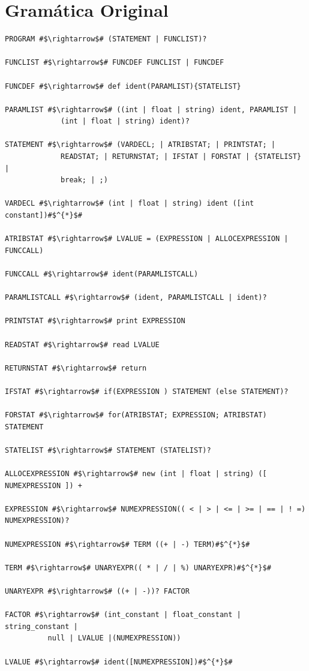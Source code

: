 \documentclass[
	12pt,				%
	openright,			%
	twoside,			%
	a4paper,			%
	english,			%
	french,				%
	spanish,			%
	brazil				%
	]{abntex2}
\begin{document}
\section{Gramática Original}

\begin{lstlisting}[escapechar=\#]
PROGRAM #$\rightarrow$# (STATEMENT | FUNCLIST)?

FUNCLIST #$\rightarrow$# FUNCDEF FUNCLIST | FUNCDEF  

FUNCDEF #$\rightarrow$# def ident(PARAMLIST){STATELIST}  

PARAMLIST #$\rightarrow$# ((int | float | string) ident, PARAMLIST |
             (int | float | string) ident)?  

STATEMENT #$\rightarrow$# (VARDECL; | ATRIBSTAT; | PRINTSTAT; |
             READSTAT; | RETURNSTAT; | IFSTAT | FORSTAT | {STATELIST} |
             break; | ;) 

VARDECL #$\rightarrow$# (int | float | string) ident ([int constant])#$^{*}$#

ATRIBSTAT #$\rightarrow$# LVALUE = (EXPRESSION | ALLOCEXPRESSION | FUNCCALL)

FUNCCALL #$\rightarrow$# ident(PARAMLISTCALL)  

PARAMLISTCALL #$\rightarrow$# (ident, PARAMLISTCALL | ident)?  

PRINTSTAT #$\rightarrow$# print EXPRESSION  

READSTAT #$\rightarrow$# read LVALUE  

RETURNSTAT #$\rightarrow$# return  

IFSTAT #$\rightarrow$# if(EXPRESSION ) STATEMENT (else STATEMENT)?  

FORSTAT #$\rightarrow$# for(ATRIBSTAT; EXPRESSION; ATRIBSTAT) STATEMENT  

STATELIST #$\rightarrow$# STATEMENT (STATELIST)?  

ALLOCEXPRESSION #$\rightarrow$# new (int | float | string) ([ NUMEXPRESSION ]) + 

EXPRESSION #$\rightarrow$# NUMEXPRESSION(( < | > | <= | >= | == | ! =) NUMEXPRESSION)? 

NUMEXPRESSION #$\rightarrow$# TERM ((+ | -) TERM)#$^{*}$#  

TERM #$\rightarrow$# UNARYEXPR(( * | / | %) UNARYEXPR)#$^{*}$#

UNARYEXPR #$\rightarrow$# ((+ | -))? FACTOR  

FACTOR #$\rightarrow$# (int_constant | float_constant | string_constant |
          null | LVALUE |(NUMEXPRESSION))  

LVALUE #$\rightarrow$# ident([NUMEXPRESSION])#$^{*}$# 
\end{lstlisting}
\end{document}
